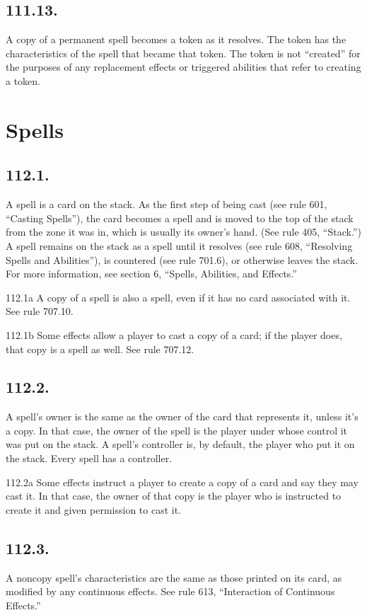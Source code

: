\subsection*{111.13.}
A copy of a permanent spell becomes a token as it resolves. The token has the characteristics of the spell that became that token. The token is not “created” for the purposes of any replacement effects or triggered abilities that refer to creating a token.

\section{Spells}
\subsection*{112.1.}
A spell is a card on the stack. As the first step of being cast (see rule 601, “Casting Spells”), the card becomes a spell and is moved to the top of the stack from the zone it was in, which is usually its owner’s hand. (See rule 405, “Stack.”) A spell remains on the stack as a spell until it resolves (see rule 608, “Resolving Spells and Abilities”), is countered (see rule 701.6), or otherwise leaves the stack. For more information, see section 6, “Spells, Abilities, and Effects.”

112.1a A copy of a spell is also a spell, even if it has no card associated with it. See rule 707.10.

112.1b Some effects allow a player to cast a copy of a card; if the player does, that copy is a spell as well. See rule 707.12.

\subsection*{112.2.}
A spell’s owner is the same as the owner of the card that represents it, unless it’s a copy. In that case, the owner of the spell is the player under whose control it was put on the stack. A spell’s controller is, by default, the player who put it on the stack. Every spell has a controller.

112.2a Some effects instruct a player to create a copy of a card and say they may cast it. In that case, the owner of that copy is the player who is instructed to create it and given permission to cast it.

\subsection*{112.3.}
A noncopy spell’s characteristics are the same as those printed on its card, as modified by any continuous effects. See rule 613, “Interaction of Continuous Effects.”


